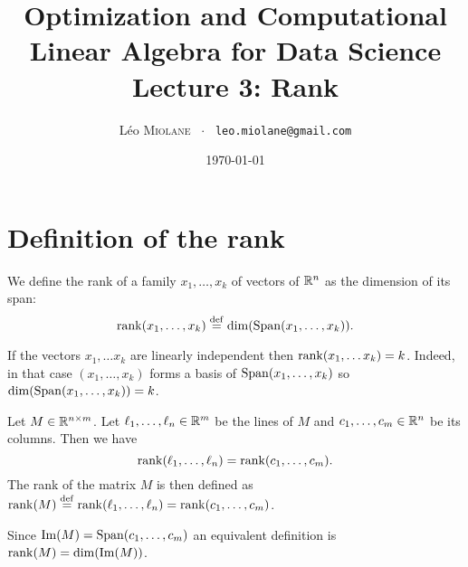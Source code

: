 \documentclass[11pt,nocut]{article}
\title{\vspace{-2.0cm}%
	Optimization and Computational Linear Algebra for Data Science\\
	Lecture 3: Rank}
\author{Léo \textsc{Miolane} \ $\cdot$ \ \texttt{leo.miolane@gmail.com}}
\date{\today}
\begin{document}
\maketitle



\section{Definition of the rank}

\begin{definition}
	We define the rank of a family $x_1, \dots, x_k$ of vectors of $\mathbb{R}^n$ as the dimension of its span:
	$$
	{{\rm rank}}(x_1, \dots, x_k) \overset{\rm def}{=} {{\rm dim}} ({{\rm Span}}(x_1, \dots, x_k)).
	$$
\end{definition}

If the vectors $x_1, \dots x_k$ are linearly independent then ${{\rm rank}}(x_1, \dots x_k) = k$. Indeed, in that case $(x_1, \dots, x_k)$ forms a basis of ${{\rm Span}}(x_1, \dots, x_k)$ so ${{\rm dim}}({{\rm Span}}(x_1, \dots, x_k)) = k$.


\begin{definition}\label{def:rank}
	Let $M \in \mathbb{R}^{n \times m}$. Let $\ell_1, \dots, \ell_n \in \mathbb{R}^m$ be the lines of $M$ and $c_1, \dots, c_m \in \mathbb{R}^n$ be its columns.
	Then we have
	\begin{equation}\label{eq:rank}
	{{\rm rank}}(\ell_1, \dots, \ell_n) = {{\rm rank}}(c_1, \dots, c_m).
	\end{equation}
	The rank of the matrix $M$ is then defined as ${{\rm rank}}(M) \overset{\rm def}{=}{{\rm rank}}(\ell_1, \dots, \ell_n) = {{\rm rank}}(c_1, \dots, c_m)$.
\end{definition}

Since ${{\rm Im}}(M) = {{\rm Span}}(c_1, \dots, c_m)$ an equivalent definition is ${{\rm rank}}(M) = {{\rm dim}}({{\rm Im}}(M))$.
\\
\end{document}
